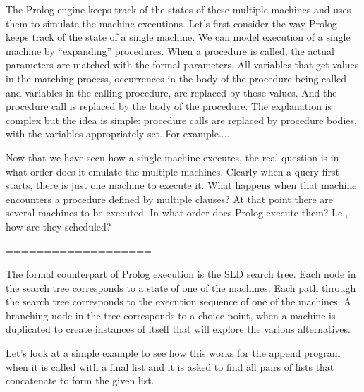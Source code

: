 The Prolog engine keeps track of the states of these multiple machines
and uses them to simulate the machine executions.  Let's first
consider the way Prolog keeps track of the state of a single machine.
We can model execution of a single machine by ``expanding''
procedures.  When a procedure is called, the actual parameters are
matched with the formal parameters.  All variables that get values in
the matching process, occurrences in the body of the procedure being
called and variables in the calling procedure, are replaced by those
values.  And the procedure call is replaced by the body of the
procedure.  The explanation is complex but the idea is simple:
procedure calls are replaced by procedure bodies, with the variables
appropriately set.  For example.....

Now that we have seen how a single machine executes, the real question
is in what order does it emulate the multiple machines.  Clearly when
a query first starts, there is just one machine to execute it.  What
happens when that machine encounters a procedure defined by multiple
clauses?  At that point there are several machines to be executed.  In
what order does Prolog execute them?  I.e., how are they scheduled?

===================

The formal counterpart of Prolog execution is the SLD search tree.
Each node in the search tree corresponds to a state of one of the
machines.  Each path through the search tree corresponds to the
execution sequence of one of the machines.  A branching node in the
tree corresponds to a choice point, when a machine is duplicated to
create instances of itself that will explore the various alternatives.

Let's look at a simple example to see how this works for the append
program when it is called with a final list and it is asked to find
all pairs of lists that concatenate to form the given list.

